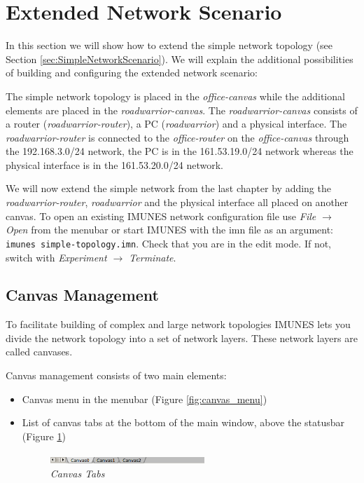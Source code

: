 \section{Extended Network Scenario}
In this section we will show how to extend the simple network topology (see
Section \ref{sec:SimpleNetworkScenario}). We will explain the additional
possibilities of building and configuring the extended network scenario:

The simple network topology is placed in the \emph{office-canvas} while the
additional elements are placed in the \emph{roadwarrior-canvas}. The
\emph{roadwarrior-canvas} consists of a router (\emph{roadwarrior-router}), a
PC (\emph{roadwarrior}) and a physical interface. The \emph{roadwarrior-router}
is connected to the \emph{office-router} on the \emph{office-canvas} through
the 192.168.3.0/24 network, the PC is in the 161.53.19.0/24 network whereas the
physical interface is in the 161.53.20.0/24 network.

We will now extend the simple network from the last chapter by adding the
\emph{roadwarrior-router}, \emph{roadwarrior} and the physical interface all
placed on another canvas. To open an existing IMUNES network configuration file
use \emph{File $\to$ Open} from the menubar or start IMUNES with the imn file
as an argument: \texttt{imunes simple-topology.imn}. Check that you are in the
edit mode. If not, switch with \emph{Experiment $\to$ Terminate}.

\subsection{Canvas Management}
To facilitate building of complex and large network topologies IMUNES lets you
divide the network topology into a set of network layers. These network layers
are called canvases.

Canvas management consists of two main elements:
\begin{itemize}
    \item Canvas menu in the menubar (Figure \ref{fig:canvas_menu})
    \item List of canvas tabs at the bottom of the main window, above the
statusbar (Figure \ref{fig:canvas_tabs_list})
    \begin{figure}[H]
	\centering
	\vspace{10pt}
	\includegraphics[width=0.55\textwidth]{./images/canvas_tabs_list.png}
	\caption{\emph{Canvas Tabs}}
	\label{fig:canvas_tabs_list}
    \end{figure}
\end{itemize}

